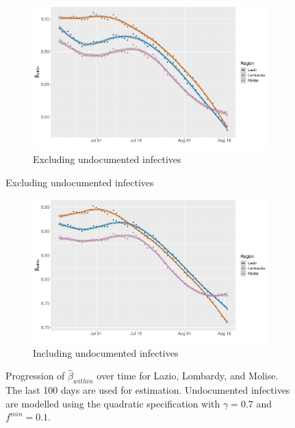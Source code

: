 \documentclass[12pt]{article}
\begin{document}
	\begin{figure}[H]
	    \centering
	    \begin{subfigure}{\textwidth}
	      \centering
	      \includegraphics[width=0.94\linewidth]{output/model_within_lag14_betawithin_compare_rolling.pdf}
	      \caption{Excluding undocumented infectives}
	      \label{fig:model_within_compare_highest_regular}
	    \end{subfigure}
    \end{figure}
    \begin{figure}[H]\ContinuedFloat
	    \begin{subfigure}{\textwidth}
	      \centering
	      \includegraphics[width=0.94\linewidth]{output/model_within_lag14_betawithin_compare_UndocQuadratic_rolling.pdf}
	      \caption{Including undocumented infectives}
	      \label{fig:model_within_compare_highest_undoc}
	    \end{subfigure}
	    \caption{Progression of $\widehat{\beta}_{within}$ over time for Lazio, Lombardy, and Molise. The last 100 days are used for estimation. Undocumented infectives are modelled using the quadratic specification with $\gamma = 0.7$ and $f^{min}=0.1$.}
	    \label{fig:model_within_compare_highest}
    \end{figure}
	
\end{document}
